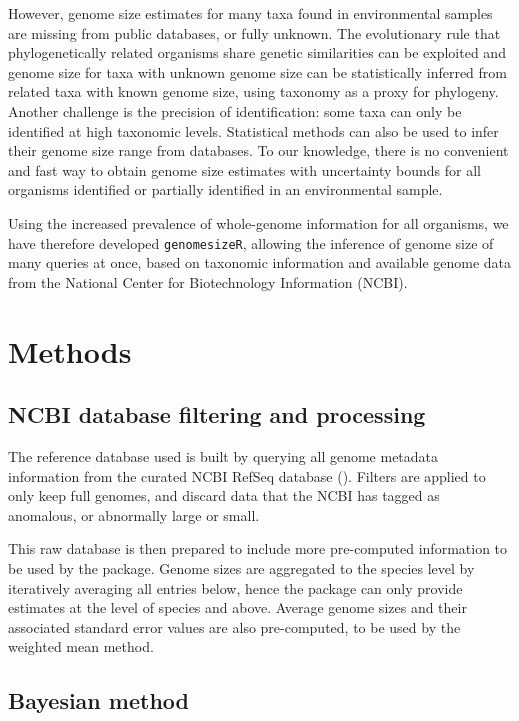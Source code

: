 \documentclass[
]{article}
\begin{document}
However, genome size estimates for many taxa found in environmental
samples are missing from public databases, or fully unknown. The
evolutionary rule that phylogenetically related organisms share genetic
similarities can be exploited and genome size for taxa with unknown
genome size can be statistically inferred from related taxa with known
genome size, using taxonomy as a proxy for phylogeny. Another challenge
is the precision of identification: some taxa can only be identified at
high taxonomic levels. Statistical methods can also be used to infer
their genome size range from databases. To our knowledge, there is no
convenient and fast way to obtain genome size estimates with uncertainty
bounds for all organisms identified or partially identified in an
environmental sample.

Using the increased prevalence of whole-genome information for all
organisms, we have therefore developed \texttt{genomesizeR}, allowing
the inference of genome size of many queries at once, based on taxonomic
information and available genome data from the National Center for
Biotechnology Information (NCBI).

\section{Methods}\label{methods}

\subsection{NCBI database filtering and
processing}\label{ncbi-database-filtering-and-processing}

The reference database used is built by querying all genome metadata
information from the curated NCBI RefSeq database
(). Filters are
applied to only keep full genomes, and discard data that the NCBI has
tagged as anomalous, or abnormally large or small.

This raw database is then prepared to include more pre-computed
information to be used by the package. Genome sizes are aggregated to
the species level by iteratively averaging all entries below, hence the
package can only provide estimates at the level of species and above.
Average genome sizes and their associated standard error values are also
pre-computed, to be used by the weighted mean method.

\subsection{Bayesian method}\label{bayesian-method}
\end{document}
